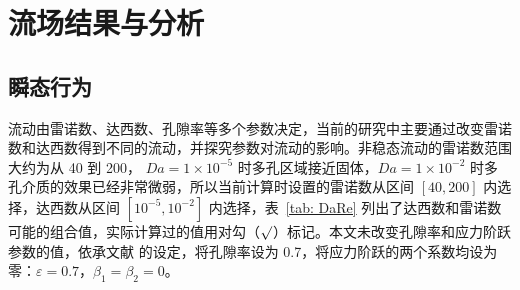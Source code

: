\chapter{流场结果与分析}\label{chap: flow pattern}

\section{瞬态行为}\label{sec: transient}

流动由雷诺数、达西数、孔隙率等多个参数决定，当前的研究中主要通过改变雷诺数和达西数得到不同的流动，并探究参数对流动的影响。非稳态流动的雷诺数范围大约为从 40 到 200， $Da=1\times 10^{-5}$ 时多孔区域接近固体，$Da=1\times 10^{-2}$ 时多孔介质的效果已经非常微弱，所以当前计算时设置的雷诺数从区间 $[40,200]$ 内选择，达西数从区间 $[10^{-5},10^{-2}]$ 内选择，表~\ref{tab: DaRe} 列出了达西数和雷诺数可能的组合值，实际计算过的值用对勾（$\surd$）标记。本文未改变孔隙率和应力阶跃参数的值，依承文献  的设定，将孔隙率设为 0.7，将应力阶跃的两个系数均设为零：$\varepsilon=0.7$，$\beta_1 = \beta_2=0$。

